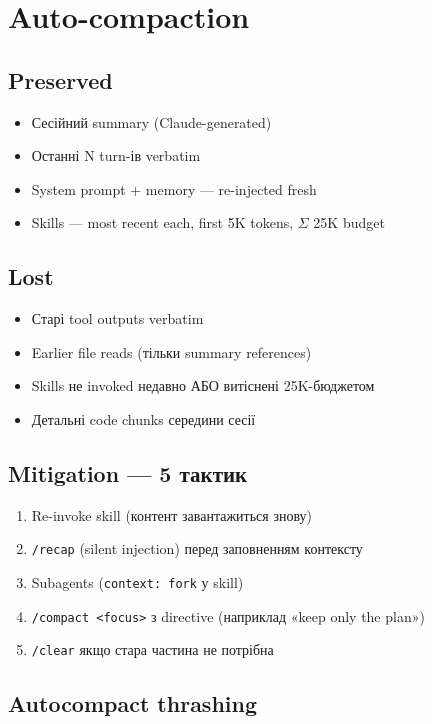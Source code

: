 \documentclass[11pt,a4paper]{article}
\begin{document}
\section{Auto-compaction}

\subsection{Preserved}

\begin{itemize}
\item Сесійний summary (Claude-generated)
\item Останні N turn-ів verbatim
\item System prompt + memory --- re-injected fresh
\item Skills --- most recent each, first 5K tokens, $\Sigma$ 25K budget
\end{itemize}

\subsection{Lost}

\begin{itemize}
\item Старі tool outputs verbatim
\item Earlier file reads (тільки summary references)
\item Skills не invoked недавно АБО витіснені 25K-бюджетом
\item Детальні code chunks середини сесії
\end{itemize}

\subsection{Mitigation --- 5 тактик}

\begin{enumerate}
\item Re-invoke skill (контент завантажиться знову)
\item \texttt{/recap} (silent injection) перед заповненням контексту
\item Subagents (\texttt{context: fork} у skill)
\item \texttt{/compact <focus>} з directive (наприклад «keep only the plan»)
\item \texttt{/clear} якщо стара частина не потрібна
\end{enumerate}

\subsection{Autocompact thrashing}
\end{document}
